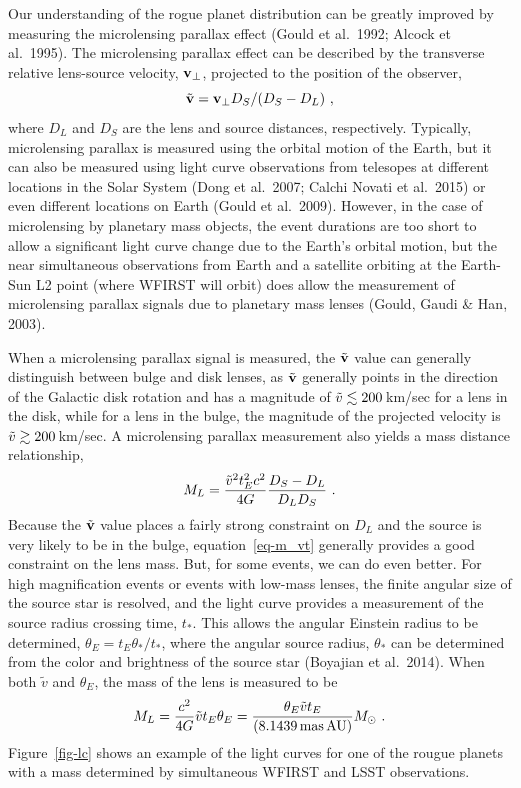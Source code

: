 Our understanding of the rogue planet distribution can be greatly improved
by measuring the microlensing parallax effect (Gould et al.\ 1992;
Alcock et al.\ 1995). The microlensing parallax effect can be described
by the transverse relative lens-source velocity, ${\bf v}_{\rm \perp}$, projected
to the position of the observer,
\begin{equation}
\tilde{\bf v} = {\bf v}_{\rm \perp} D_S/(D_S-D_L) \ , \label{eq-vp}
\end{equation}
where $D_L$ and $D_S$ are the lens and source distances, respectively.
Typically, microlensing parallax
is measured using the orbital motion of the Earth, but it can also be
measured using light curve observations from telesopes at different locations
in the Solar System (Dong et al.\ 2007; Calchi Novati et al.\ 2015) or
even different locations on Earth (Gould et al.\ 2009). However, in the
case of microlensing by planetary mass objects, the event durations are
too short to allow a significant light curve change due to the Earth's
orbital motion, but the near simultaneous observations from Earth and a
satellite orbiting at the Earth-Sun L2 point (where WFIRST will orbit) does
allow the measurement of microlensing parallax signals due to planetary mass
lenses (Gould, Gaudi \& Han, 2003).

When a microlensing parallax signal is measured, the $\tilde{\bf v}$ value
can generally distinguish between bulge and disk lenses, as $\tilde{\bf v}$
generally points in the direction of the Galactic disk rotation and has
a magnitude of $\tilde{v} \lesssim 200\,$km/sec for a lens in the
disk, while for a lens in the bulge, the magnitude of the projected velocity
is $\tilde{v} \gtrsim 200\,$km/sec. A microlensing parallax measurement also
yields a mass distance relationship,
\begin{equation}
   M_L = {\tilde{v}^2 t_E^2 c^2 \over 4 G} {D_S-D_L \over D_L D_S} \ .
   \label{eq-m_vt}
\end{equation}
Because the $\tilde{\bf v}$ value places a fairly strong constraint
on $D_L$ and the source is very likely to be in the bulge, equation~\ref{eq-m_vt}
generally provides a good constraint on the lens mass. But, for some
events, we can do even better. For high magnification events or events
with low-mass lenses, the finite angular size of the source star is
resolved, and the light curve provides a measurement of the source
radius crossing time, $t_*$. This allows the angular Einstein radius
to be determined, $\theta_E = t_E \theta_*/t_*$, where the angular
source radius, $\theta_*$ can be determined from the color and brightness
of the source star (Boyajian et al.\ 2014). When both $\tilde{v}$ and
$\theta_E$, the mass of the lens is measured to be
\begin{equation}
M_L = {c^2\over 4G} \tilde{v} t_E \theta_E = {\theta_E\tilde{v} t_E \over (8.1439\,{\rm mas\, AU})} M_{\odot} \ .
\label{eq-m}
\end{equation}
Figure~\ref{fig-lc} shows an example of the light curves for one of the
rougue planets with a mass determined by simultaneous WFIRST and LSST
observations.

